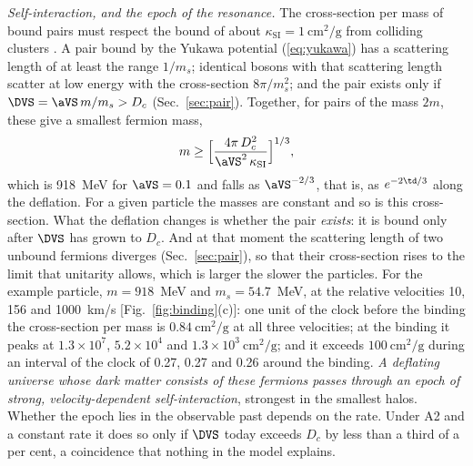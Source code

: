 \emph{Self-interaction, and the epoch of the resonance.} The cross-section per mass of bound pairs
must respect the bound of about $\kappa_{\mathrm{SI}}=1~\mathrm{cm^{2}/g}$ from colliding clusters
\cite{Markevitch2004,Randall2008}. A pair bound by the Yukawa potential (\ref{eq:yukawa}) has a
scattering length of at least the range $1/m_s$; identical bosons with that scattering length
scatter at low energy with the cross-section $8\pi/m_s^{2}$; and the pair exists only if
$\DVS=\aVS\,m/m_s>D_c$ (Sec.~\ref{sec:pair}). Together, for pairs of the mass $2m$, these give a
smallest fermion mass,
\begin{equation}
m\ge\Big[\frac{4\pi\,D_c^{2}}{\aVS^{2}\,\kappa_{\mathrm{SI}}}\Big]^{1/3},
\label{eq:mmin}
\end{equation}
which is 918~MeV for $\aVS=0.1$ and falls as $\aVS^{-2/3}$, that is, as $e^{-2\td/3}$ along the
deflation. For a given particle the masses are constant and so is this
cross-section. What the deflation changes is whether the pair \emph{exists}: it is bound only after
$\DVS$ has grown to $D_c$. And at that moment the scattering length of two unbound fermions
diverges (Sec.~\ref{sec:pair}), so that their cross-section rises to the limit that unitarity
allows, which is larger the slower the particles. For the example particle, $m=918$~MeV and
$m_s=54.7$~MeV, at the relative velocities 10, 156 and 1000~km/s [Fig.~\ref{fig:binding}(c)]: one
unit of the clock before the binding the cross-section per mass is $0.84~\mathrm{cm^{2}/g}$ at all
three velocities; at the binding it peaks at $1.3\times10^{7}$, $5.2\times10^{4}$ and
$1.3\times10^{3}~\mathrm{cm^{2}/g}$; and it exceeds $100~\mathrm{cm^{2}/g}$ during an interval of the
clock of 0.27, 0.27 and 0.26 around the binding. \emph{A deflating universe whose dark matter
consists of these fermions passes through an epoch of strong, velocity-dependent self-interaction},
strongest in the smallest halos. Whether the epoch lies in the observable past depends on the rate.
Under A2 and a constant rate it does so only if $\DVS$ today exceeds $D_c$ by less than a third of a
per cent, a coincidence that nothing in the model explains.

